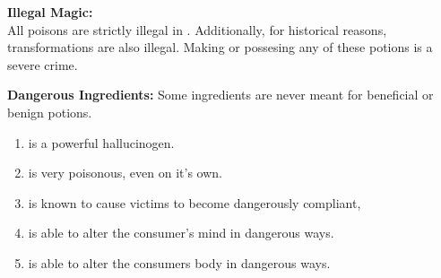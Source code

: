 \documentclass[green]{NeptuneBall}
\begin{document}
{\bf Illegal Magic:}\\
All poisons are strictly illegal in \pAtlantis{}. Additionally, for historical reasons, transformations are also illegal. Making or possesing any of these potions is a severe crime.

{\bf Dangerous Ingredients:}
Some ingredients are never meant for beneficial or benign potions. 
\begin{enumerate}
\item \iHemlock{} is a powerful hallucinogen.  %
\item \iSnails{} is very poisonous, even on it's own. %
\item \iPearl{} is  known to cause victims to become dangerously compliant, %
\item \iManOfWar{} is able to alter the consumer's mind in dangerous ways. %
\item \iSquid{} is able to alter the consumers body in dangerous ways.  %
\end{enumerate}
\end{document}
